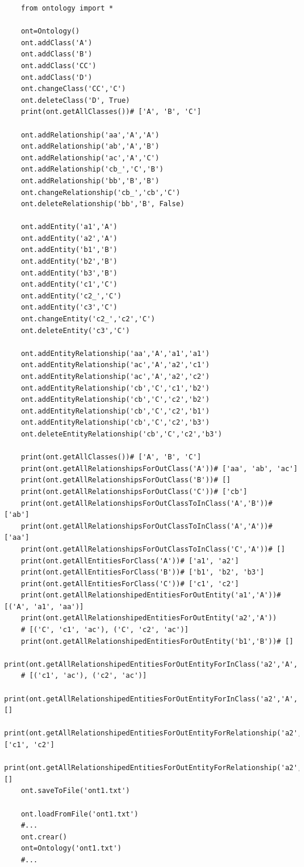 \documentclass{article}
\begin{document}
	\normalsize
	\begin{verbatim}
	from ontology import *
	
	ont=Ontology()
	ont.addClass('A')
	ont.addClass('B')
	ont.addClass('CC')
	ont.addClass('D')
	ont.changeClass('CC','C')
	ont.deleteClass('D', True)
	print(ont.getAllClasses())# ['A', 'B', 'C']
	
	ont.addRelationship('aa','A','A')
	ont.addRelationship('ab','A','B')
	ont.addRelationship('ac','A','C')
	ont.addRelationship('cb_','C','B')
	ont.addRelationship('bb','B','B')
	ont.changeRelationship('cb_','cb','C')
	ont.deleteRelationship('bb','B', False)
	
	ont.addEntity('a1','A')
	ont.addEntity('a2','A')
	ont.addEntity('b1','B')
	ont.addEntity('b2','B')
	ont.addEntity('b3','B')
	ont.addEntity('c1','C')
	ont.addEntity('c2_','C')
	ont.addEntity('c3','C')
	ont.changeEntity('c2_','c2','C')
	ont.deleteEntity('c3','C')
	
	ont.addEntityRelationship('aa','A','a1','a1')
	ont.addEntityRelationship('ac','A','a2','c1')
	ont.addEntityRelationship('ac','A','a2','c2')
	ont.addEntityRelationship('cb','C','c1','b2')
	ont.addEntityRelationship('cb','C','c2','b2')
	ont.addEntityRelationship('cb','C','c2','b1')
	ont.addEntityRelationship('cb','C','c2','b3')
	ont.deleteEntityRelationship('cb','C','c2','b3')
	
	print(ont.getAllClasses())# ['A', 'B', 'C']
	print(ont.getAllRelationshipsForOutClass('A'))# ['aa', 'ab', 'ac']
	print(ont.getAllRelationshipsForOutClass('B'))# []
	print(ont.getAllRelationshipsForOutClass('C'))# ['cb']
	print(ont.getAllRelationshipsForOutClassToInClass('A','B'))# ['ab']
	print(ont.getAllRelationshipsForOutClassToInClass('A','A'))# ['aa']
	print(ont.getAllRelationshipsForOutClassToInClass('C','A'))# []
	print(ont.getAllEntitiesForClass('A'))# ['a1', 'a2']
	print(ont.getAllEntitiesForClass('B'))# ['b1', 'b2', 'b3']
	print(ont.getAllEntitiesForClass('C'))# ['c1', 'c2']
	print(ont.getAllRelationshipedEntitiesForOutEntity('a1','A'))# [('A', 'a1', 'aa')]
	print(ont.getAllRelationshipedEntitiesForOutEntity('a2','A'))
	# [('C', 'c1', 'ac'), ('C', 'c2', 'ac')]
	print(ont.getAllRelationshipedEntitiesForOutEntity('b1','B'))# []
	print(ont.getAllRelationshipedEntitiesForOutEntityForInClass('a2','A','C'))
	# [('c1', 'ac'), ('c2', 'ac')]
	print(ont.getAllRelationshipedEntitiesForOutEntityForInClass('a2','A','B'))# []
	print(ont.getAllRelationshipedEntitiesForOutEntityForRelationship('a2','A','ac'))# ['c1', 'c2']
	print(ont.getAllRelationshipedEntitiesForOutEntityForRelationship('a2','A','ab'))# []
	ont.saveToFile('ont1.txt')
	
	ont.loadFromFile('ont1.txt')
	#...
	ont.crear()
	ont=Ontology('ont1.txt')
	#...
	\end{verbatim}
	\large
	
\end{document}
